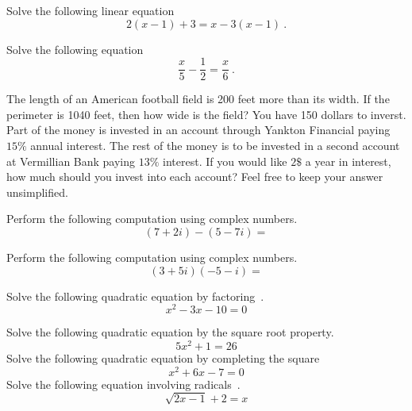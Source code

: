 \documentclass[addpoints,12pt]{exam}
\begin{document}
\begin{center}
\end{center}
\vspace{0.1in}
\vspace{0.2in}




\begin{questions}
	\question Solve the following linear equation 
   \[
 2(x-1)+3 = x-3(x-1)~.
\]

 \begin{solution}

 \end{solution}
 
\question Solve the following equation 
   \[
 \frac{x}{5}- \frac{1}{2} = \frac{x}{6}~.
\]

\question The length of an American football field is 200 feet more than its width. If the perimeter is 1040 feet, then how wide is the field? 
\question You have 150 dollars to inverst. Part of the money is invested in an account through Yankton Financial paying $15\%$ annual interest. The rest of the money is to be invested in a second account at Vermillian Bank paying $13\%$ interest. If you would like $2\$$ a year in interest, how much should you invest into each account? Feel free to keep your answer unsimplified. 

\question Perform the following computation using complex numbers. 
   \[
		 (7+2i)-(5-7i)= 
\]



\question Perform the following computation using complex numbers. 
\[
		 (3+5i)(-5-i)=
\]

\question Solve the following quadratic equation by factoring~. 
\[
	x^{2}-3x-10=0 
\]

\question Solve the following quadratic equation by the square root property. 
   \[
5x^{2}+1=26
\]
\question Solve the following quadratic equation by completing the square 
   \[
x^{2}+6x-7=0
\]
\question Solve the following equation involving radicals~.
   \[
    \sqrt{2x-1}+2=x
	 \]


\end{questions}
\end{document}
